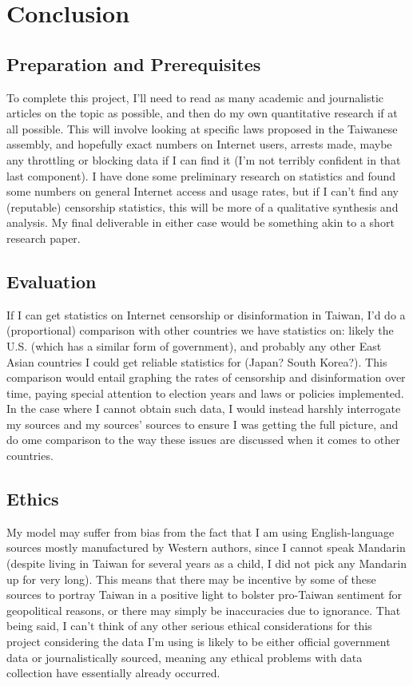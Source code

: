 \section{Conclusion}\label{sec:conclusion}

\subsection{Preparation and Prerequisites}
To complete this project, I'll need to read as many academic and journalistic articles on the topic as possible, and then do my own quantitative research if at
all possible. This will involve looking at specific laws proposed in the Taiwanese assembly, and hopefully exact numbers on Internet users, arrests made,
maybe any throttling or blocking data if I can find it (I'm not terribly confident in that last component). I have done some preliminary research on statistics
and found some numbers on general Internet access and usage rates, but if I can't find any (reputable) censorship statistics, this will be more of a qualitative
synthesis and analysis. My final deliverable in either case would be something akin to a short research paper.

\subsection{Evaluation}

If I can get statistics on Internet censorship or disinformation in Taiwan, I'd do a (proportional) comparison with other countries we have statistics on: likely
the U.S. (which has a similar form of government), and probably any other East Asian countries I could get reliable statistics for (Japan? South Korea?). This
comparison would entail graphing the rates of censorship and disinformation over time, paying special attention to election years and laws or policies 
implemented. In the case where I cannot obtain such data, I would instead harshly interrogate my sources and my sources' sources to ensure I was getting the full
picture, and do ome comparison to the way these issues are discussed when it comes to other countries.

\subsection{Ethics}

My model may suffer from bias from the fact that I am using English-language sources mostly manufactured by Western authors, since I cannot speak Mandarin
(despite living in Taiwan for several years as a child, I did not pick any Mandarin up for very long). This means that there may be incentive by some of these
sources to portray Taiwan in a positive light to bolster pro-Taiwan sentiment for geopolitical reasons, or there may simply be inaccuracies due to ignorance.
That being said, I can't think of any other serious ethical considerations for this project considering the data I'm using is likely to be either official
government data or journalistically sourced, meaning any ethical problems with data collection have essentially already occurred.